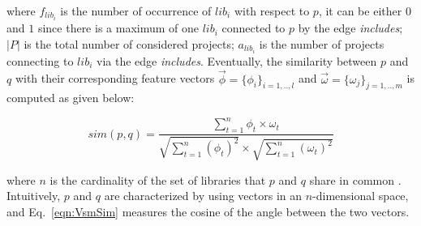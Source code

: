 \noindent
where $f_{lib_{i}}$ is the number of occurrence of $lib_{i}$ with respect to $p$, it can be either $0$ and $1$ since there is a maximum of one $lib_{i}$ connected to $p$ by the edge \emph{includes}; $\left | P \right |$ is the total number of considered projects; $a_{lib_{i}}$ is the number of projects connecting to $lib_{i}$ via the edge \emph{includes}. %
Eventually, the similarity between $p$ and $q$ with their corresponding feature vectors $\overrightarrow{\phi}=\{\phi_{i}\}_{i=1,..,l}$ and $\overrightarrow{\omega}=\{\omega_{j}\}_{j=1,..,m}$ is computed as given below:%

\begin{equation} \label{eqn:VsmSim}
sim(p,q)=\frac{\sum_{t=1}^{n}\phi_{t}\times \omega_{t}}{\sqrt{\sum_{t=1}^{n}(\phi_{t})^{2} }\times \sqrt{\sum_{t=1}^{n}(\omega_{t})^{2}}} 
\end{equation}

where $n$ is the cardinality of the set of libraries that $p$ and $q$ share in common \cite{DiNoia:2012:LOD:2362499.2362501}. Intuitively, $p$ and $q$ are characterized by using vectors in an $n$-dimensional space, and Eq.~\ref{eqn:VsmSim} measures the cosine of the angle between the two vectors. %







